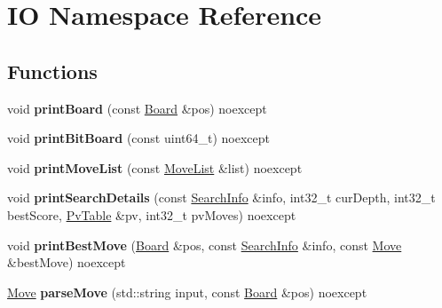 \hypertarget{namespaceIO}{}\section{IO Namespace Reference}
\label{namespaceIO}
\subsection*{Functions}
\begin{DoxyCompactItemize}
\item 
\mbox{\label{namespaceIO_a4a4d2d4f2b6ab5c67e9c087d93db774a}} 
void {\bfseries print\+Board} (const \mbox{\hyperlink{classBoard}{Board}} \&pos) noexcept
\item 
\mbox{\label{namespaceIO_a63d56732e8ecc79bfe532301e858017e}} 
void {\bfseries print\+Bit\+Board} (const uint64\+\_\+t) noexcept
\item 
\mbox{\label{namespaceIO_a34aa1665a2c3f474c1073f0ff9b67db0}} 
void {\bfseries print\+Move\+List} (const \mbox{\hyperlink{classMoveList}{Move\+List}} \&list) noexcept
\item 
\mbox{\label{namespaceIO_a029095064998d6f3bcf6022cf2876705}} 
void {\bfseries print\+Search\+Details} (const \mbox{\hyperlink{structSearchInfo}{Search\+Info}} \&info, int32\+\_\+t cur\+Depth, int32\+\_\+t best\+Score, \mbox{\hyperlink{classPvTable}{Pv\+Table}} \&pv, int32\+\_\+t pv\+Moves) noexcept
\item 
\mbox{\label{namespaceIO_a308ab394cf5fd18910986fbe556d01bb}} 
void {\bfseries print\+Best\+Move} (\mbox{\hyperlink{classBoard}{Board}} \&pos, const \mbox{\hyperlink{structSearchInfo}{Search\+Info}} \&info, const \mbox{\hyperlink{classMove}{Move}} \&best\+Move) noexcept
\item 
\mbox{\label{namespaceIO_aade794118f1d0f0cba9d335e10360ce1}} 
\mbox{\hyperlink{classMove}{Move}} {\bfseries parse\+Move} (std\+::string input, const \mbox{\hyperlink{classBoard}{Board}} \&pos) noexcept
\end{DoxyCompactItemize}
